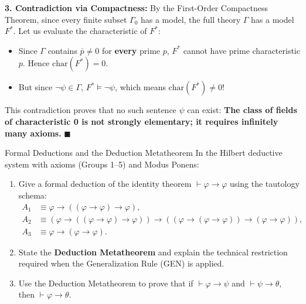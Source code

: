 \begin{solution}
\textbf{3. Contradiction via Compactness:}
By the First-Order Compactness Theorem, since every finite subset $\Gamma_0$ has a model, the full theory $\Gamma$ has a model $F^*$.
Let us evaluate the characteristic of $F^*$:
\begin{itemize}[leftmargin=1.4em,itemsep=2pt]
  \item Since $\Gamma$ contains $\bar{p} \ne 0$ for \textbf{every} prime $p$, $F^*$ cannot have prime characteristic $p$. Hence $\mathrm{char}(F^*) = 0$.
  \item But since $\neg \psi \in \Gamma$, $F^* \models \neg \psi$, which means $\mathrm{char}(F^*) \ne 0$!
\end{itemize}
This contradiction proves that no such sentence $\psi$ can exist:
\textbf{The class of fields of characteristic 0 is not strongly elementary; it requires infinitely many axioms.} \hfill $\blacksquare$
\end{solution}

\begin{exercise}{Formal Deductions and the Deduction Metatheorem}
In the Hilbert deductive system with axioms (Groups 1--5) and Modus Ponens:
\begin{enumerate}[leftmargin=1.5em,itemsep=2pt]
  \item Give a formal deduction of the identity theorem $\vdash \varphi \to \varphi$ using the tautology schema:
  \begin{align*}
  A_1 &\equiv \varphi \to ((\varphi \to \varphi) \to \varphi), \\
  A_2 &\equiv (\varphi \to ((\varphi \to \varphi) \to \varphi)) \to ((\varphi \to (\varphi \to \varphi)) \to (\varphi \to \varphi)), \\
  A_3 &\equiv \varphi \to (\varphi \to \varphi).
  \end{align*}
  \item State the \textbf{Deduction Metatheorem} and explain the technical restriction required when the Generalization Rule (GEN) is applied.
  \item Use the Deduction Metatheorem to prove that if $\vdash \varphi \to \psi$ and $\vdash \psi \to \theta$, then $\vdash \varphi \to \theta$.
\end{enumerate}
\end{exercise}

\begin{tabletworkspace}[5.0cm]
\end{tabletworkspace}

